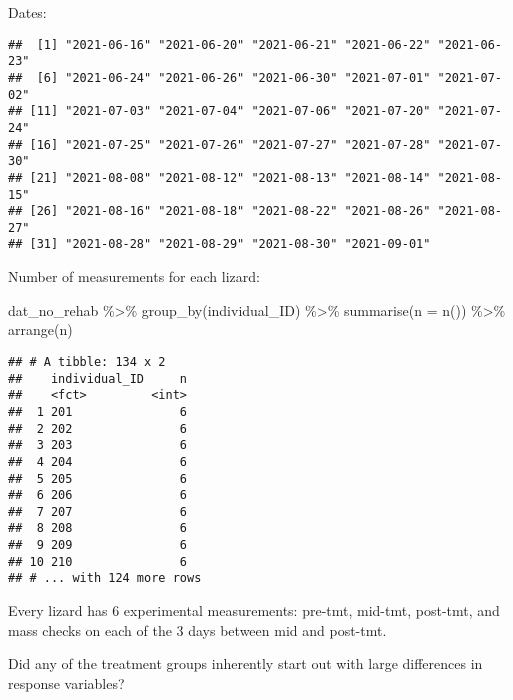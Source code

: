\documentclass[
]{article}
\newenvironment{Shaded}{\begin{snugshade}}{\end{snugshade}}
\newcommand{\AttributeTok}[1]{\textcolor[rgb]{0.77,0.63,0.00}{#1}}
\newcommand{\FunctionTok}[1]{\textcolor[rgb]{0.00,0.00,0.00}{#1}}
\newcommand{\NormalTok}[1]{#1}
\newcommand{\SpecialCharTok}[1]{\textcolor[rgb]{0.00,0.00,0.00}{#1}}
\begin{document}
Dates:

\begin{Shaded}
\end{Shaded}

\begin{verbatim}
##  [1] "2021-06-16" "2021-06-20" "2021-06-21" "2021-06-22" "2021-06-23"
##  [6] "2021-06-24" "2021-06-26" "2021-06-30" "2021-07-01" "2021-07-02"
## [11] "2021-07-03" "2021-07-04" "2021-07-06" "2021-07-20" "2021-07-24"
## [16] "2021-07-25" "2021-07-26" "2021-07-27" "2021-07-28" "2021-07-30"
## [21] "2021-08-08" "2021-08-12" "2021-08-13" "2021-08-14" "2021-08-15"
## [26] "2021-08-16" "2021-08-18" "2021-08-22" "2021-08-26" "2021-08-27"
## [31] "2021-08-28" "2021-08-29" "2021-08-30" "2021-09-01"
\end{verbatim}

Number of measurements for each lizard:

\begin{Shaded}
\begin{Highlighting}[]
\NormalTok{dat\_no\_rehab }\SpecialCharTok{\%\textgreater{}\%}
  \FunctionTok{group\_by}\NormalTok{(individual\_ID) }\SpecialCharTok{\%\textgreater{}\%}
  \FunctionTok{summarise}\NormalTok{(}\AttributeTok{n =} \FunctionTok{n}\NormalTok{()) }\SpecialCharTok{\%\textgreater{}\%}
  \FunctionTok{arrange}\NormalTok{(n)}
\end{Highlighting}
\end{Shaded}

\begin{verbatim}
## # A tibble: 134 x 2
##    individual_ID     n
##    <fct>         <int>
##  1 201               6
##  2 202               6
##  3 203               6
##  4 204               6
##  5 205               6
##  6 206               6
##  7 207               6
##  8 208               6
##  9 209               6
## 10 210               6
## # ... with 124 more rows
\end{verbatim}

Every lizard has 6 experimental measurements: pre-tmt, mid-tmt,
post-tmt, and mass checks on each of the 3 days between mid and
post-tmt.

Did any of the treatment groups inherently start out with large
differences in response variables?
\end{document}
